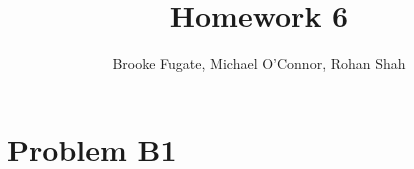 \documentclass[12pt]{article}
\begin{document}
\pagestyle{plain}
\titleformat{\subsection}[runin]
  {\normalfont\large\bfseries}{\thesubsection}{1em}{}
\titleformat{\subsubsection}[runin]
  {\bfseries}{}{1em}{}

\title{Homework 6}
\author{Brooke Fugate, Michael O'Connor, Rohan Shah}
\date{}

\maketitle

\newpage
\section*{Problem B1}
\end{document}
